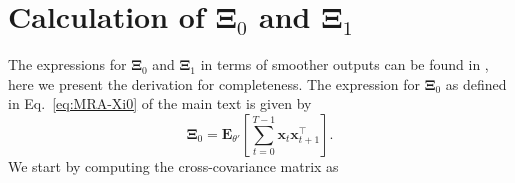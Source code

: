 \documentclass[review,authoryear,3p]{elsarticle}
\begin{document}
\section{Calculation of $\boldsymbol\Xi_{0}$ and $\boldsymbol\Xi_{1}$}\label{ap:Xiderivation}
The expressions for $\boldsymbol\Xi_{0}$ and $\boldsymbol\Xi_{1}$ in terms of smoother outputs can be found in \cite{Shumway2000}, here we present the derivation for completeness.  The expression for  $\boldsymbol\Xi_{0}$ as defined in Eq.~\eqref{eq:MRA-Xi0} of the main text is given by
   \begin{equation}\label{eq:appXi0}
	 \boldsymbol\Xi_0=\mathbf E_{\theta'}\left[\sum_{t=0}^{T-1}\mathbf x_t\mathbf x_{t+1}^\top\right].
	\end{equation}                                                                                                
	We start by computing the cross-covariance matrix as 
	
\end{document}
